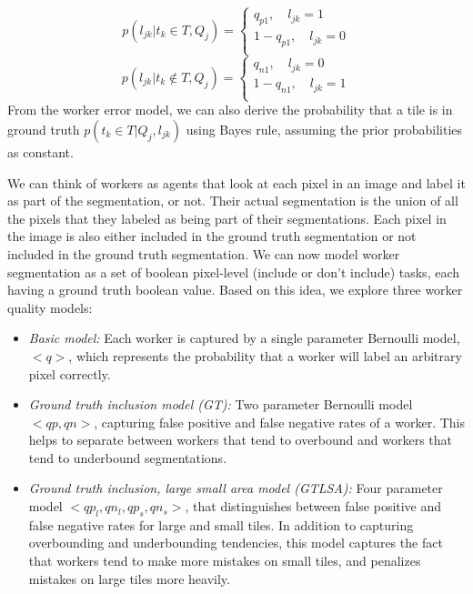 \begin{enumerate}
\begin{equation}
p(l_{jk}|t_k\in T,Q_j) = \begin{cases}
               q_{p1}, \quad l_{jk}=1  \\
               1-q_{p1}, \quad l_{jk}=0  \\
            \end{cases}
\end{equation}
\begin{equation}
p(l_{jk}|t_k\notin T,Q_j) = \begin{cases}
               q_{n1}, \quad l_{jk}=0  \\
               1-q_{n1}, \quad l_{jk}=1  \\
            \end{cases}
\end{equation}
From the worker error model, we can also derive the probability that a tile is in ground truth $p(t_k\in T|Q_j, l_{jk})$ using Bayes rule, assuming the prior probabilities as constant.
\end{enumerate}

We can think of workers as agents that look at each pixel in an image and label it as part of the segmentation, or not. Their actual segmentation is the union of all the pixels that they labeled as being part of their segmentations. Each pixel in the image is also either included in the ground truth segmentation or not included in the ground truth segmentation. We can now model worker segmentation as a set of boolean pixel-level (include or don't include) tasks, each having a ground truth boolean value. Based on this idea, we explore three worker quality models:
\begin{itemize}
\item {\em Basic model:} Each worker is captured by a single parameter Bernoulli model, $<q>$, which represents the probability that a worker will label an arbitrary pixel correctly.
\item {\em Ground truth inclusion model (GT):} Two parameter Bernoulli model $<qp, qn>$, capturing false positive and false negative rates of a worker. This helps to separate between workers that tend to overbound and workers that tend to underbound segmentations.
\item {\em Ground truth inclusion, large small area model (GTLSA):} Four parameter model $<qp_l, qn_l, qp_s, qn_s>$, that distinguishes between false positive and false negative rates for large and small tiles. In addition to capturing overbounding and underbounding tendencies, this model captures the fact that workers tend to make more mistakes on small tiles, and penalizes mistakes on large tiles more heavily.
\end{itemize}

